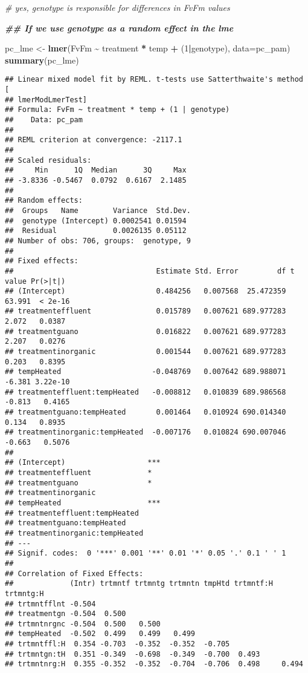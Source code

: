 \documentclass[
]{article}
\newenvironment{Shaded}{\begin{snugshade}}{\end{snugshade}}
\newcommand{\AttributeTok}[1]{\textcolor[rgb]{0.13,0.29,0.53}{#1}}
\newcommand{\CommentTok}[1]{\textcolor[rgb]{0.56,0.35,0.01}{\textit{#1}}}
\newcommand{\DecValTok}[1]{\textcolor[rgb]{0.00,0.00,0.81}{#1}}
\newcommand{\DocumentationTok}[1]{\textcolor[rgb]{0.56,0.35,0.01}{\textbf{\textit{#1}}}}
\newcommand{\FunctionTok}[1]{\textcolor[rgb]{0.13,0.29,0.53}{\textbf{#1}}}
\newcommand{\NormalTok}[1]{#1}
\newcommand{\OtherTok}[1]{\textcolor[rgb]{0.56,0.35,0.01}{#1}}
\newcommand{\SpecialCharTok}[1]{\textcolor[rgb]{0.81,0.36,0.00}{\textbf{#1}}}
\begin{document}
\begin{Shaded}
\begin{Highlighting}[]
  \CommentTok{\# yes, genotype is responsible for differences in FvFm values}

  \DocumentationTok{\#\# If we use genotype as a random effect in the lme}

\NormalTok{pc\_lme }\OtherTok{\textless{}{-}} \FunctionTok{lmer}\NormalTok{(FvFm }\SpecialCharTok{\textasciitilde{}}\NormalTok{ treatment }\SpecialCharTok{*}\NormalTok{ temp }\SpecialCharTok{+}\NormalTok{ (}\DecValTok{1}\SpecialCharTok{|}\NormalTok{genotype), }\AttributeTok{data=}\NormalTok{pc\_pam)}
\FunctionTok{summary}\NormalTok{(pc\_lme)}
\end{Highlighting}
\end{Shaded}

\begin{verbatim}
## Linear mixed model fit by REML. t-tests use Satterthwaite's method [
## lmerModLmerTest]
## Formula: FvFm ~ treatment * temp + (1 | genotype)
##    Data: pc_pam
## 
## REML criterion at convergence: -2117.1
## 
## Scaled residuals: 
##     Min      1Q  Median      3Q     Max 
## -3.8336 -0.5467  0.0792  0.6167  2.1485 
## 
## Random effects:
##  Groups   Name        Variance  Std.Dev.
##  genotype (Intercept) 0.0002541 0.01594 
##  Residual             0.0026135 0.05112 
## Number of obs: 706, groups:  genotype, 9
## 
## Fixed effects:
##                                 Estimate Std. Error         df t value Pr(>|t|)
## (Intercept)                     0.484256   0.007568  25.472359  63.991  < 2e-16
## treatmenteffluent               0.015789   0.007621 689.977283   2.072   0.0387
## treatmentguano                  0.016822   0.007621 689.977283   2.207   0.0276
## treatmentinorganic              0.001544   0.007621 689.977283   0.203   0.8395
## tempHeated                     -0.048769   0.007642 689.988071  -6.381 3.22e-10
## treatmenteffluent:tempHeated   -0.008812   0.010839 689.986568  -0.813   0.4165
## treatmentguano:tempHeated       0.001464   0.010924 690.014340   0.134   0.8935
## treatmentinorganic:tempHeated  -0.007176   0.010824 690.007046  -0.663   0.5076
##                                  
## (Intercept)                   ***
## treatmenteffluent             *  
## treatmentguano                *  
## treatmentinorganic               
## tempHeated                    ***
## treatmenteffluent:tempHeated     
## treatmentguano:tempHeated        
## treatmentinorganic:tempHeated    
## ---
## Signif. codes:  0 '***' 0.001 '**' 0.01 '*' 0.05 '.' 0.1 ' ' 1
## 
## Correlation of Fixed Effects:
##             (Intr) trtmntf trtmntg trtmntn tmpHtd trtmntf:H trtmntg:H
## trtmntfflnt -0.504                                                   
## treatmentgn -0.504  0.500                                            
## trtmntnrgnc -0.504  0.500   0.500                                    
## tempHeated  -0.502  0.499   0.499   0.499                            
## trtmntffl:H  0.354 -0.703  -0.352  -0.352  -0.705                    
## trtmntgn:tH  0.351 -0.349  -0.698  -0.349  -0.700  0.493             
## trtmntnrg:H  0.355 -0.352  -0.352  -0.704  -0.706  0.498     0.494
\end{verbatim}
\end{document}
